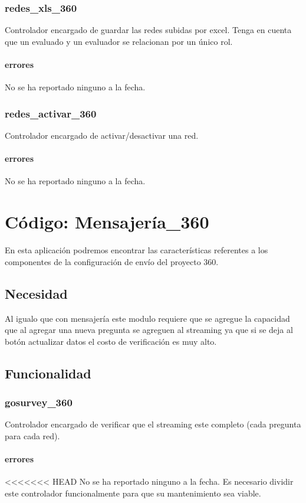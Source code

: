 \documentclass[10pt,a4paper]{book}
\begin{document}
	\subsection{redes\_xls\_360}
	Controlador encargado de guardar las redes subidas por excel. Tenga en cuenta que un evaluado y un evaluador se relacionan por un único rol.
	\subsubsection{errores}
	No se ha reportado ninguno a la fecha.

	\subsection{redes\_activar\_360}
	Controlador encargado de activar/desactivar una red.
	\subsubsection{errores}
	No se ha reportado ninguno a la fecha.


	\chapter{Código: Mensajería\_360}

	En esta aplicación podremos encontrar las características referentes a los componentes de la configuración de envío del proyecto 360.

	\section{Necesidad}
	Al igualo que con mensajería este modulo requiere que se agregue la capacidad que al agregar una nueva pregunta se agreguen al streaming ya que si se deja al botón actualizar datos el costo de verificación es muy alto.

	\section{Funcionalidad}


	\subsection{gosurvey\_360}
	Controlador encargado de verificar que el streaming este completo (cada pregunta para cada red).
	\subsubsection{errores}
<<<<<<< HEAD
	No se ha reportado ninguno a la fecha. Es necesario dividir este controlador funcionalmente para que su mantenimiento sea viable.
\end{document}
